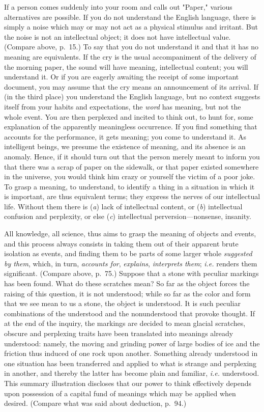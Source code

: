 \documentclass[letterpaper]{book}
\begin{document}
If a person comes suddenly into your room and calls out "Paper," various
alternatives are possible. If you do not understand the English
language, there is simply a noise which may or may not act as a physical
stimulus
and irritant. But the noise is not an intellectual object; it does not
have intellectual value. (Compare above, p.\ 15.) To say that you do not
understand it and that it has no meaning are equivalents. If the cry is
the usual accompaniment of the delivery of the morning paper, the sound
will have meaning, intellectual content; you will understand it. Or if
you are eagerly awaiting the receipt of some important document, you may
assume that the cry means an announcement of its arrival. If (in the
third place) you understand the English language, but no context
suggests itself from your habits and expectations, the \emph{word} has
meaning, but not the whole event. You are then perplexed and incited to
think out, to hunt for, some explanation of the apparently meaningless
occurrence. If you find something that accounts for the performance, it
gets meaning; you come to understand it. As intelligent beings, we
presume the existence of meaning, and its absence is an anomaly. Hence,
if it should turn out that the person merely meant to inform you that
there was a scrap of paper on the sidewalk, or that paper existed
somewhere in the universe, you would think him crazy or yourself the
victim of a poor joke. To grasp a meaning, to understand, to identify a
thing in a situation in which it is important, are thus equivalent
terms; they express the nerves of our intellectual life. Without them
there is (\emph{a}) lack of intellectual content, or (\emph{b})
intellectual confusion and perplexity, or else (\emph{c}) intellectual
perversion---nonsense, insanity.


All knowledge, all science, thus aims to grasp the meaning of objects
and events, and this process always consists in taking them out of their
apparent brute isolation as events, and finding them to be parts of
some
larger whole \emph{suggested by them}, which, in turn, \emph{accounts
for}, \emph{explains}, \emph{interprets them}; \emph{i.e.} renders them
significant. (Compare above, p.\ 75.) Suppose that a stone with peculiar
markings has been found. What do these scratches mean? So far as the
object forces the raising of this question, it is not understood; while
so far as the color and form that we see mean to us a stone, the object
is understood. It is such peculiar combinations of the understood and
the nonunderstood that provoke thought. If at the end of the inquiry,
the markings are decided to mean glacial scratches, obscure and
perplexing traits have been translated into meanings already understood:
namely, the moving and grinding power of large bodies of ice and the
friction thus induced of one rock upon another. Something already
understood in one situation has been transferred and applied to what is
strange and perplexing in another, and thereby the latter has become
plain and familiar, \emph{i.e.} understood. This summary illustration
discloses that our power to think effectively depends upon possession of
a capital fund of meanings which may be applied when desired. (Compare
what was said about deduction, p.\ 94.)
\end{document}
